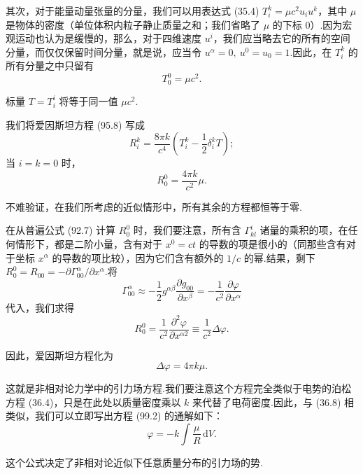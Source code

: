 其次，对于能量动量张量的分量，我们可以用表达式 (35.4) $T_i^k=\mu c^2u_iu^k$，其中 $\mu$ 是物体的密度（单位体积内粒子静止质量之和；我们省略了 $\mu$ 的下标 0）.因为宏观运动也认为是缓慢的，那么，对于四维速度 $u^i$，我们应当略去它的所有的空间分量，而仅仅保留时间分量，就是说，应当令 $u^{\alpha}=0,\ u^0=u_0=1$.因此，在 $T_i^k$ 的所有分量之中只留有
\begin{equation}
  T_0^0=\mu c^{2}.
\end{equation}

标量 $T=T_i^i$ 将等于同一值 $\mu c^{2}$.

我们将爱因斯坦方程 (95.8) 写成
\begin{equation*}
  R_i^k=\frac{8\pi k}{c^{4}}\left(T_i^k-\frac{1}{2}\delta_i^kT\right);
\end{equation*}
当 $i=k=0$ 时，
\begin{equation*}
  R_0^0=\frac{4\pi k}{c^{2}}\mu.
\end{equation*}

不难验证，在我们所考虑的近似情形中，所有其余的方程都恒等于零.

在从普遍公式 (92.7) 计算 $R_0^0$ 时，我们要注意，所有含 $\Gamma_{kl}^i$ 诸量的乘积的项，在任何情形下，都是二阶小量，含有对于 $x^0=ct$ 的导数的项是很小的（同那些含有对于坐标 $x^{\alpha}$ 的导数的项比较），因为它们含有额外的 $1/c$ 的幂.结果，剩下 $R_0^0=R_{00}=-\partial\Gamma_{00}^{\alpha}/\partial x^{\alpha}$.将
\begin{equation*}
  \Gamma_{00}^{\alpha}\approx-\frac{1}{2}g^{\alpha\beta}
  \frac{\partial g_{00}}{\partial x^{\beta}}
  =-\frac{1}{c^{2}}\frac{\partial\varphi}{\partial x^{\alpha}}
\end{equation*}
代入，我们求得
\begin{equation*}
  R_0^0=\frac{1}{c^{2}}\frac{\partial^{2}\varphi}{\partial x^{\alpha 2}}
  \equiv\frac{1}{c^{2}}\Delta\varphi.
\end{equation*}

因此，爱因斯坦方程化为
\begin{equation}
  \Delta\varphi=4\pi k\mu.
\end{equation}

这就是非相对论力学中的引力场方程.我们要注意这个方程完全类似于电势的泊松方程 (36.4)，只是在此处以质量密度乘以 $k$ 来代替了电荷密度.因此，与 (36.8) 相类似，我们可以立即写出方程 (99.2) 的通解如下：
\begin{equation}
  \varphi=-k\int\frac{\mu}{R}\,\mathrm{d}V.
\end{equation}

这个公式决定了非相对论近似下任意质量分布的引力场的势.

